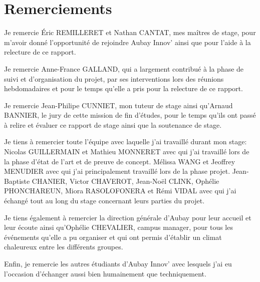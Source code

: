 \documentclass[11pt]{article}
\begin{document}
  \section{Remerciements}    
    Je remercie Éric REMILLERET et Nathan CANTAT, mes maîtres de stage, 
    pour m'avoir donné l'opportunité de rejoindre 
    Aubay Innov' ainsi que pour l'aide à la relecture de ce rapport.    
    
    Je remercie Anne-France GALLAND, qui a largement contribué à la phase de suivi et d'organisation du projet, par ses interventions 
    lors des réunions hebdomadaires et pour le temps qu'elle a pris pour la relecture de ce rapport.    
    
    Je remercie Jean-Philipe CUNNIET, mon tuteur de stage ainsi qu'Arnaud BANNIER, le jury de cette mission de fin d'études, 
    pour le temps qu'ils ont passé à relire et évaluer ce rapport de stage ainsi que la soutenance de stage.    

    Je tiens à remercier toute l'équipe avec laquelle j'ai 
    travaillé durant mon stage:    
    Nicolas GUILLERMAIN et Mathieu MONNERET avec qui j'ai travaillé lors 
    de la phase d'état de l'art et de preuve de concept.
    Mélissa WANG et Jeoffrey MENUDIER avec qui j'ai principalement 
    travaillé lors de la phase projet. 
    Jean-Baptiste CHANIER, Victor CHAVEROT, Jean-Noël CLINK,
    Ophélie PHONCHAREUN, Miora RASOLOFONERA et Rémi VIDAL avec qui j'ai échangé tout au 
    long du stage concernant leurs parties du projet.       
    
    Je tiens également à remercier la direction générale d'Aubay pour leur accueil et leur écoute ainsi qu'Ophélie CHEVALIER, campus manager, 
    pour tous les événements qu'elle a pu organiser et qui ont permis d'établir un climat chaleureux entre les différents groupes.
        
    Enfin, je remercie les autres étudiants d’Aubay Innov' avec lesquels j'ai eu l'occasion d'échanger aussi bien humainement que techniquement.

  \pagebreak
\end{document}
